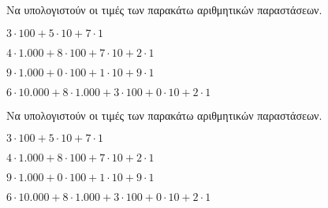 Να υπολογιστούν οι τιμές των παρακάτω αριθμητικών παραστάσεων.
\begin{rlist}
\item $ 3\cdot100+5\cdot10+7\cdot1  $
\item $ 4\cdot1.000+8\cdot100+7\cdot10+2\cdot1 $
\item $ 9\cdot1.000+0\cdot100+1\cdot10+9\cdot1 $
\item $ 6\cdot10.000+8\cdot1.000+3\cdot100+0\cdot10+2\cdot1 $
\end{rlist}
Να υπολογιστούν οι τιμές των παρακάτω αριθμητικών παραστάσεων.
\begin{rlist}
\item $ 3\cdot100+5\cdot10+7\cdot1  $
\item $ 4\cdot1.000+8\cdot100+7\cdot10+2\cdot1 $
\item $ 9\cdot1.000+0\cdot100+1\cdot10+9\cdot1 $
\item $ 6\cdot10.000+8\cdot1.000+3\cdot100+0\cdot10+2\cdot1 $
\end{rlist}
